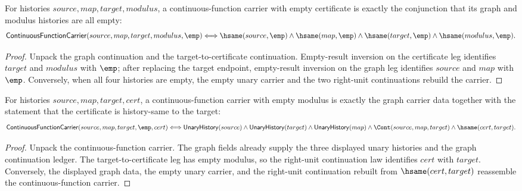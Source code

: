 \begin{theorem}
\label{thm:continuous-function-carrier-empty-cert-iff}
For histories $source,map,target,modulus$, a continuous-function carrier with
empty certificate is exactly the conjunction that its graph and modulus
histories are all empty:
$$
\mathsf{ContinuousFunctionCarrier}(source,map,target,modulus,\emp)
\Longleftrightarrow
\hsame(source,\emp)\land\hsame(map,\emp)\land
\hsame(target,\emp)\land\hsame(modulus,\emp).
$$
\end{theorem}
\begin{proof}
Unpack the graph continuation and the target-to-certificate continuation.
Empty-result inversion on the certificate leg identifies $target$ and
$modulus$ with $\emp$; after replacing the target endpoint, empty-result
inversion on the graph leg identifies $source$ and $map$ with $\emp$.
Conversely, when all four histories are empty, the empty unary carrier and the
two right-unit continuations rebuild the carrier.
\end{proof}

\begin{theorem}
\label{thm:continuous-function-carrier-empty-modulus-iff}
For histories $source,map,target,cert$, a continuous-function carrier with
empty modulus is exactly the graph carrier data together with the statement
that the certificate is history-same to the target:
$$
\mathsf{ContinuousFunctionCarrier}(source,map,target,\emp,cert)
\Longleftrightarrow
\mathsf{UnaryHistory}(source)\land\mathsf{UnaryHistory}(target)\land
\mathsf{UnaryHistory}(map)\land
\Cont(source,map,target)\land\hsame(cert,target).
$$
\end{theorem}
\begin{proof}
Unpack the continuous-function carrier. The graph fields already supply the
three displayed unary histories and the graph continuation ledger. The
target-to-certificate leg has empty modulus, so the right-unit continuation
law identifies $cert$ with $target$. Conversely, the displayed graph data, the
empty unary carrier, and the right-unit continuation rebuilt from
$\hsame(cert,target)$ reassemble the continuous-function carrier.
\end{proof}

